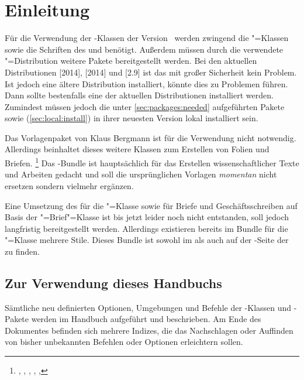 \chapter{Einleitung}
Für die Verwendung der \TUDScript-Klassen der Version~\vTUDScript{} werden 
zwingend die \KOMAScript"=Klassen~\vKOMAScript{} sowie die Schriften des \CDs 
\Univers und \DIN benötigt. Außerdem müssen durch die verwendete 
"=Distribution weitere Pakete bereitgestellt werden. 
Bei den aktuellen Distributionen [2014], 
[2014] und [2.9] 
ist das mit großer Sicherheit kein Problem. Ist jedoch eine ältere Distribution
installiert, könnte dies zu Problemen führen. Dann sollte bestenfalls
eine der aktuellen Distributionen installiert werden. Zumindest müssen jedoch 
die unter \autoref{sec:packages:needed} aufgeführten Pakete sowie \TUDScript 
(\autoref{sec:local:install}) in ihrer neuesten Version lokal installiert sein.

Das Vorlagenpaket von Klaus Bergmann ist für die Verwendung nicht notwendig. 
Allerdings beinhaltet dieses weitere Klassen zum Erstellen von Folien 
und Briefen.%
\footnote{%
  , , , , 
  , 
}
Das \TUDScript-Bundle ist hauptsächlich für das Erstellen wissenschaftlicher 
Texte und Arbeiten gedacht und soll die ursprünglichen Vorlagen \emph{momentan} 
nicht ersetzen sondern vielmehr ergänzen. 

Eine Umsetzung des \CDs für die "=Klasse sowie für Briefe und 
Geschäftsschreiben auf Basis der \KOMAScript"=Brief"=Klasse  
ist bis jetzt leider noch nicht entstanden, soll jedoch langfristig 
bereitgestellt werden. Allerdings existieren bereits im Bundle 
 für die "=Klasse mehrere Stile. Dieses 
Bundle ist sowohl im  als 
auch auf der  
{-Seite der \TnUD} zu finden.



\section{Zur Verwendung dieses Handbuchs}
Sämtliche neu definierten Optionen, Umgebungen und Befehle der 
\TUDScript-Klassen und \TUDScript-Pakete werden im Handbuch aufgeführt und 
beschrieben. Am Ende des Dokumentes befinden sich mehrere Indizes, die das 
Nachschlagen oder Auffinden von bisher unbekannten Befehlen oder Optionen 
erleichtern sollen.

